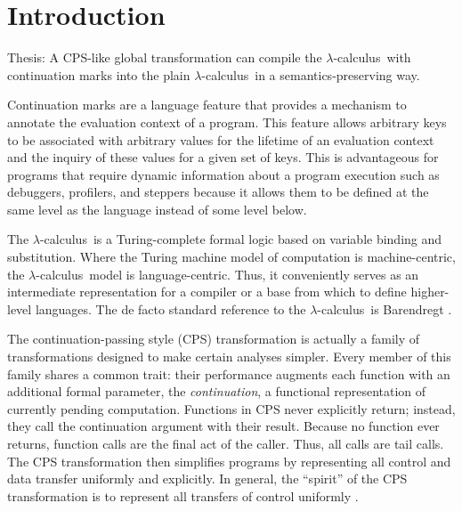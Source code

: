 \documentclass[ms,electronic,twosidetoc,letterpaper,chaptercenter,parttop]{byumsphd}
\title{\Title}
\author{\Author}
\newcommand{\lc}{$\lambda$-calculus}
\begin{document}
\maketitle
{}

\chapter{Introduction}

Thesis: A CPS-like global transformation can compile the \lc\ with continuation marks into
the plain \lc\ in a semantics-preserving way.

Continuation marks \cite{clements2006portable} are a language feature that provides a
mechanism to annotate the evaluation context of a program. This feature allows arbitrary
keys to be associated with arbitrary values for the lifetime of an evaluation context and
the inquiry of these values for a given set of keys. This is advantageous for programs
that require dynamic information about a program execution such as debuggers, profilers,
and steppers because it allows them to be defined at the same level as the language
instead of some level below.

The \lc\ is a Turing-complete formal logic based on variable binding and substitution.
Where the Turing machine model of computation is machine-centric, the \lc\ model is
language-centric. Thus, it conveniently serves as an intermediate representation for a
compiler or a base from which to define higher-level languages. The de facto standard
reference to the \lc\ is Barendregt \cite{barendregt1984lambda}.

The continuation-passing style (CPS) transformation is actually a family of
transformations designed to make certain analyses simpler. Every member of this family
shares a common trait: their performance augments each function with an additional formal
parameter, the \emph{continuation}, a functional representation of currently pending
computation. Functions in CPS never explicitly return; instead, they call the continuation
argument with their result. Because no function ever returns, function calls are the final
act of the caller. Thus, all calls are tail calls. The CPS transformation then simplifies
programs by representing all control and data transfer uniformly and explicitly. In
general, the ``spirit'' of the CPS transformation is to represent all transfers of control
uniformly \cite{sabry1994formal}.
\end{document}
